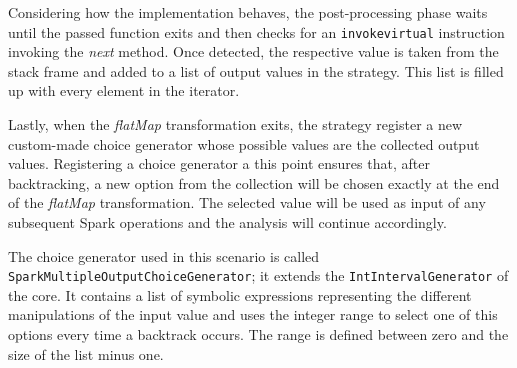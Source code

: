 Considering how the implementation behaves, the post-processing phase waits until the passed function exits and then checks for an \texttt{invokevirtual} instruction invoking the \textit{next} method. Once detected, the respective value is taken from the stack frame and added to a list of output values in the strategy. This list is filled up with every element in the iterator.

Lastly, when the \textit{flatMap} transformation exits, the strategy register a new custom-made choice generator whose possible values are the collected output values. Registering a choice generator a this point ensures that, after backtracking, a new option from the collection will be chosen exactly at the end of the \textit{flatMap} transformation. The selected value will be used as input of any subsequent Spark operations and the analysis will continue accordingly.

The choice generator used in this scenario is called \texttt{SparkMultipleOutputChoiceGenerator}; it extends the \texttt{IntIntervalGenerator} of the \jpf{}
core. It contains a list of symbolic expressions representing the different manipulations of the input value and uses the integer range to select one of this options every time a backtrack occurs. The range is defined between zero and the size of the list minus one.